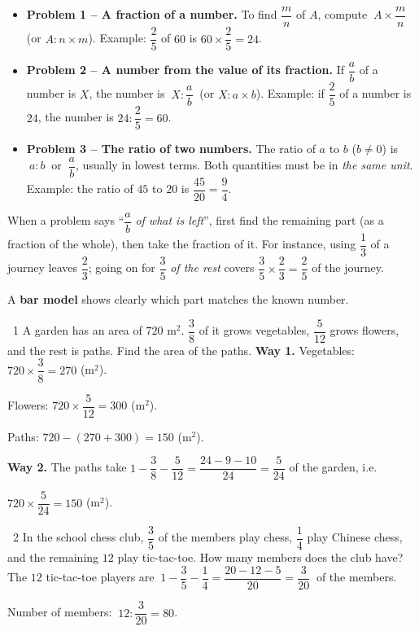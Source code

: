 \begin{knowbox}\begin{itemize}[leftmargin=1.4em,itemsep=4pt]
\item \textbf{Problem 1 -- A fraction of a number.} To find $\dfrac mn$ of $A$, compute $\ A\times\dfrac mn\ $ (or $A:n\times m$). \quad Example: $\dfrac25$ of $60$ is $60\times\dfrac25=24$.
\item \textbf{Problem 2 -- A number from the value of its fraction.} If $\dfrac ab$ of a number is $X$, the number is $\ X:\dfrac ab\ $ (or $X:a\times b$). \quad Example: if $\dfrac25$ of a number is $24$, the number is $24:\dfrac25=60$.
\item \textbf{Problem 3 -- The ratio of two numbers.} The ratio of $a$ to $b$ ($b\ne0$) is $\ a:b\ $ or $\ \dfrac ab$, usually in lowest terms. Both quantities must be in \emph{the same unit}. \quad Example: the ratio of $45$ to $20$ is $\dfrac{45}{20}=\dfrac94$.
\end{itemize}\end{knowbox}
\gap
{}
\begin{knowbox}
When a problem says ``$\dfrac ab$ \emph{of what is left}'', first find the remaining part (as a fraction of the whole), then take the fraction of it. For instance, using $\dfrac13$ of a journey leaves $\dfrac23$; going on for $\dfrac35$ \emph{of the rest} covers $\dfrac35\times\dfrac23=\dfrac25$ of the journey.\par\smallskip
A \textbf{bar model} shows clearly which part matches the known number.
\end{knowbox}
\gap
\begin{exbox}{\ExWord\ 1}
A garden has an area of $720$ m$^2$. $\dfrac38$ of it grows vegetables, $\dfrac5{12}$ grows flowers, and the rest is paths. Find the area of the paths.
\guide
\textbf{Way 1.} Vegetables: $720\times\dfrac38=270$ (m$^2$).\par Flowers: $720\times\dfrac5{12}=300$ (m$^2$).\par
Paths: $720-(270+300)=150$ (m$^2$).\par
\textbf{Way 2.} The paths take $1-\dfrac38-\dfrac5{12}=\dfrac{24-9-10}{24}=\dfrac5{24}$ of the garden, i.e.\par $720\times\dfrac5{24}=150$ (m$^2$).
\end{exbox}
\gap
\begin{exbox}{\ExWord\ 2}
In the school chess club, $\dfrac35$ of the members play chess, $\dfrac14$ play Chinese chess, and the remaining $12$ play tic-tac-toe. How many members does the club have?
\guide
The $12$ tic-tac-toe players are $\ 1-\dfrac35-\dfrac14=\dfrac{20-12-5}{20}=\dfrac3{20}\ $ of the members.\par
Number of members: $\ 12:\dfrac3{20}=80$.
\end{exbox}
